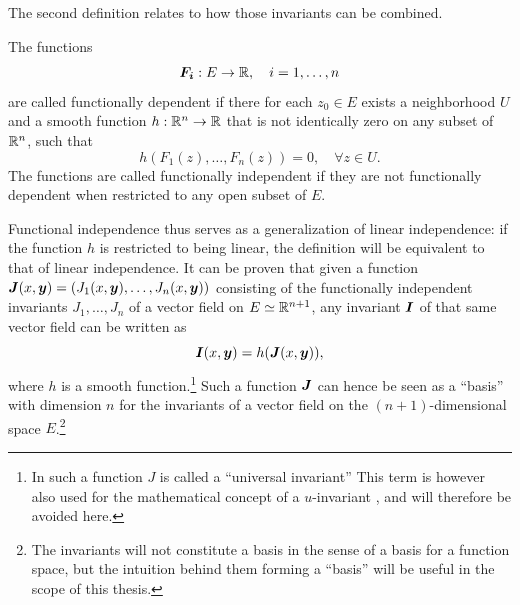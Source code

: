 The second definition relates to how those invariants can be combined.
\begin{defn}
  The functions
  \begin{equation*}
    \boldsymbol{F_i}: E \to \mathbb{R},\quad i = 1, \dots,n
  \end{equation*}
  are called functionally dependent if there for each \(z_0 \in E\) exists a neighborhood \(U\) and a smooth function \(h: \mathbb{R}^n \to \mathbb{R}\) that is not identically zero on any subset of \(\mathbb{R}^n\), such that
  \begin{equation*}
    h\left(F_1(z), \dots, F_n(z)\right) = 0,\quad \forall z \in U.
  \end{equation*}
  The functions are called functionally independent if they are not functionally dependent when restricted to any open subset of \(E\).
\end{defn}
Functional independence thus serves as a generalization of linear independence: if the function \(h\) is restricted to being linear, the definition will be equivalent to that of linear independence.
It can be proven that given a function \(\vect{J}(x, \vect{y}) = \left(J_1(x, \vect{y}), \dots, J_n(x, \vect{y})\right)\) consisting of the functionally independent invariants \(J_1, \dots, J_n\) of a vector field on \(E \simeq \mathbb{R}^{n+1}\), any invariant \(\boldsymbol{I}\) of that same vector field can be written as
\begin{equation*}
  \boldsymbol{I}(x, \boldsymbol{y}) = h(\boldsymbol{J}(x, \boldsymbol{y})),
\end{equation*}
where \(h\) is a smooth function.\footnote{In \cite{ovsiannikov1982group} such a function \(J\) is called a \enquote{universal invariant} This term is however also used for the mathematical concept of a \(u\)-invariant \cite{elman1973quadratic}, and will therefore be avoided here.}
Such a function \(\boldsymbol{J}\) can hence be seen as a \enquote{basis} with dimension \(n\) for the invariants of a vector field on the \((n+1)\)-dimensional space \(E\).\footnote{The invariants will not constitute a basis in the sense of a basis for a function space, but the intuition behind them forming a \enquote{basis} will be useful in the scope of this thesis.}

